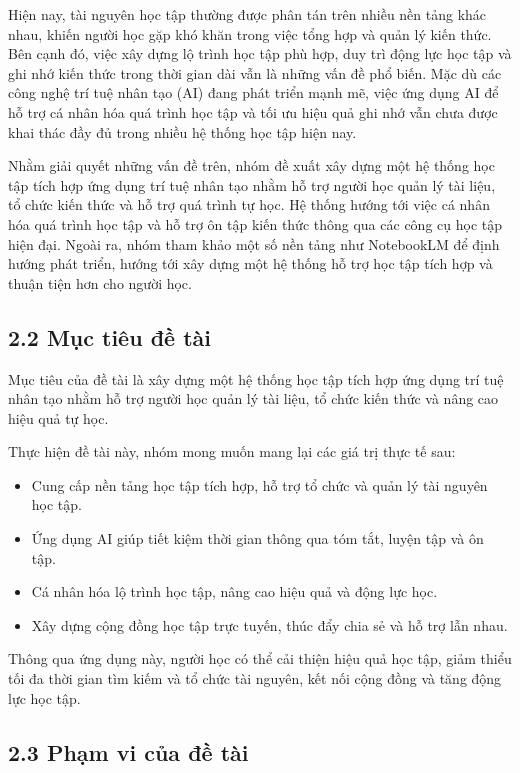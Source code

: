 Hiện nay, tài nguyên học tập thường được phân tán trên nhiều nền tảng khác nhau, khiến người học gặp khó khăn trong việc tổng hợp và quản lý kiến thức. Bên cạnh đó, việc xây dựng lộ trình học tập phù hợp, duy trì động lực học tập và ghi nhớ kiến thức trong thời gian dài vẫn là những vấn đề phổ biến. Mặc dù các công nghệ trí tuệ nhân tạo (AI) đang phát triển mạnh mẽ, việc ứng dụng AI để hỗ trợ cá nhân hóa quá trình học tập và tối ưu hiệu quả ghi nhớ vẫn chưa được khai thác đầy đủ trong nhiều hệ thống học tập hiện nay.

Nhằm giải quyết những vấn đề trên, nhóm đề xuất xây dựng một hệ thống học tập tích hợp ứng dụng trí tuệ nhân tạo nhằm hỗ trợ người học quản lý tài liệu, tổ chức kiến thức và hỗ trợ quá trình tự học. Hệ thống hướng tới việc cá nhân hóa quá trình học tập và hỗ trợ ôn tập kiến thức thông qua các công cụ học tập hiện đại. Ngoài ra, nhóm tham khảo một số nền tảng như NotebookLM để định hướng phát triển, hướng tới xây dựng một hệ thống hỗ trợ học tập tích hợp và thuận tiện hơn cho người học.

\subsection*{2.2 Mục tiêu đề tài}

Mục tiêu của đề tài là xây dựng một hệ thống học tập tích hợp ứng dụng trí tuệ nhân tạo nhằm hỗ trợ người học quản lý tài liệu, tổ chức kiến thức và nâng cao hiệu quả tự học.

Thực hiện đề tài này, nhóm mong muốn mang lại các giá trị thực tế sau:
\begin{itemize}
    \item Cung cấp nền tảng học tập tích hợp, hỗ trợ tổ chức và quản lý tài nguyên học tập.
    \item Ứng dụng AI giúp tiết kiệm thời gian thông qua tóm tắt, luyện tập và ôn tập.
    \item Cá nhân hóa lộ trình học tập, nâng cao hiệu quả và động lực học.
    \item Xây dựng cộng đồng học tập trực tuyến, thúc đẩy chia sẻ và hỗ trợ lẫn nhau.
\end{itemize}

Thông qua ứng dụng này, người học có thể cải thiện hiệu quả học tập, giảm thiểu tối đa thời gian tìm kiếm và tổ chức tài nguyên, kết nối cộng đồng và tăng động lực học tập.

\subsection*{2.3 Phạm vi của đề tài}

